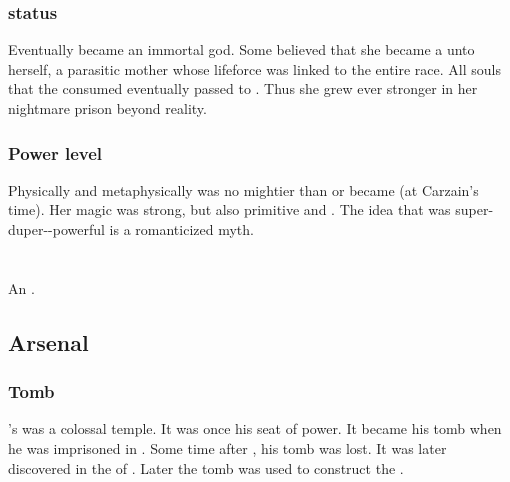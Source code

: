 \subsubsection{\Dweomer status}
Eventually \Tiamat became an immortal god. 
Some believed that she became a \dweomer unto herself, a parasitic mother whose lifeforce was linked to the entire \draconian race. 
All souls that the \dragons consumed eventually passed to \Tiamat.
Thus she grew ever stronger in her nightmare prison beyond reality. 





\subsubsection{Power level}
Physically and metaphysically \Kserasshana{} was no mightier than \Secherdamon{} or \Ishnaruchaefir{} became (at Carzain's time). 
Her magic was strong, but also primitive and \naive. 
The idea that \Kserasshana{} was super-duper-\uber-powerful is a romanticized myth. 















\section{\ValcanSethicus}
\index{\Sethicus}
An \ophidian. 









\subsection{Arsenal}





\subsubsection{Tomb}
\Sethicus's  was a colossal temple. 
It was once his seat of power.
It became his tomb when he was imprisoned in . 
Some time after , his tomb was lost. 
It was later discovered in the  of . 
Later the tomb was used to construct the . 









